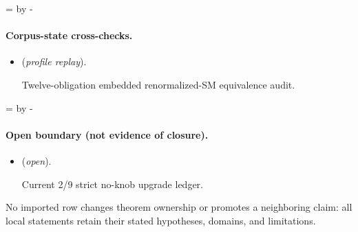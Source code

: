 \documentclass[11pt]{article}
\begin{document}
\par\begingroup{}=\pagegoal\advance{} by -\pagetotal\ifdim\dimen0<7\baselineskip\newpage\fi\endgroup
\paragraph{Corpus-state cross-checks.}
\begin{itemize}
\setlength{\itemsep}{0.25em}
\item {} (\emph{profile replay}).\par Twelve-obligation embedded renormalized-SM equivalence audit.
\end{itemize}

\par\begingroup{}=\pagegoal\advance{} by -\pagetotal\ifdim\dimen0<7\baselineskip\newpage\fi\endgroup
\paragraph{Open boundary (not evidence of closure).}
\begin{itemize}
\setlength{\itemsep}{0.25em}
\item {} (\emph{open}).\par Current 2/9 strict no-knob upgrade ledger.
\end{itemize}

No imported row changes theorem ownership or promotes a neighboring claim: all local statements retain their stated hypotheses, domains, and limitations.
\end{document}
